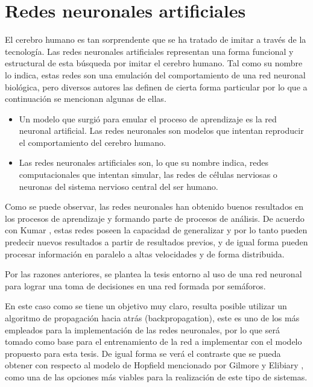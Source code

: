 \section{Redes neuronales artificiales}
		
		
		El cerebro humano es tan sorprendente que se ha tratado de imitar a trav\'{e}s de
	la tecnolog\'{i}a. Las redes neuronales artificiales representan una forma
	funcional y estructural de esta b\'{u}squeda por imitar el cerebro humano. Tal como
	su nombre lo indica, estas redes son una emulaci\'{o}n del comportamiento de una red neuronal biol\'{o}gica, pero diversos autores las definen de cierta forma particular por lo que a continuaci\'{o}n se mencionan algunas de ellas.
	
	\begin{itemize}
	  \item Un modelo que surgi\'{o} para emular el proceso de aprendizaje es la red
	  neuronal artificial. Las redes neuronales son modelos que intentan reproducir
	  el comportamiento del cerebro humano. \cite{Hilera1995}
	  \item Las redes neuronales artificiales son, lo que su nombre indica,
	  redes computacionales que intentan simular, las redes de c\'{e}lulas nerviosas o
	  neuronas del sistema nervioso central del ser humano. \cite{Graupe2007}
	\end{itemize}
	
		Como se puede observar, las redes neuronales han obtenido buenos resultados en
	los procesos de aprendizaje y formando parte de procesos de an\'{a}lisis. De
	acuerdo con Kumar \cite{Kumar2007}, estas redes poseen la capacidad de
	generalizar y por lo tanto pueden predecir nuevos resultados a partir de resultados previos, y de igual forma pueden procesar informaci\'{o}n en paralelo a altas velocidades y de forma distribuida.
	
		Por las razones anteriores, se plantea la tesis entorno al uso de una red
	neuronal para lograr una toma de decisiones en una red formada por sem\'{a}foros.
	
		En este caso como se tiene un objetivo muy claro, resulta posible
	utilizar un algoritmo de propagaci\'{o}n hacia atr\'{a}s
	(backpropagation), este es uno de los m\'{a}s empleados para la implementaci\'{o}n de las redes neuronales, por lo
	que ser\'{a} tomado como base para el entrenamiento de la red a implementar con
	el modelo propuesto para esta tesis. De igual forma se ver\'{a} el contraste
	que se pueda obtener con respecto al modelo de Hopfield mencionado por Gilmore
	y Elibiary \cite{Gilmore1993}, como una de las opciones m\'{a}s viables para la
	realizaci\'{o}n de este tipo de sistemas.

